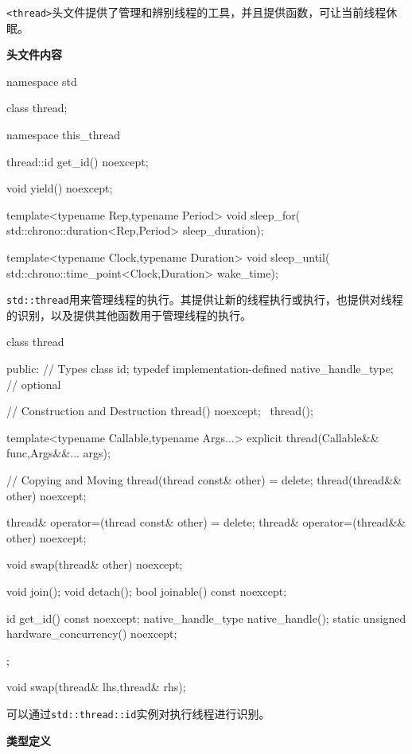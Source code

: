 
\texttt{<thread>}头文件提供了管理和辨别线程的工具，并且提供函数，可让当前线程休眠。

\textbf{头文件内容}

\begin{cpp}
namespace std
{
  class thread;

  namespace this_thread
  {
    thread::id get_id() noexcept;

    void yield() noexcept;

    template<typename Rep,typename Period>
    void sleep_for(
        std::chrono::duration<Rep,Period> sleep_duration);

    template<typename Clock,typename Duration>
    void sleep_until(
        std::chrono::time_point<Clock,Duration> wake_time);
  }
}
\end{cpp}


\texttt{std::thread}用来管理线程的执行。其提供让新的线程执行或执行，也提供对线程的识别，以及提供其他函数用于管理线程的执行。

\begin{cpp}
class thread
{
public:
  // Types
  class id;
  typedef implementation-defined native_handle_type; // optional

  // Construction and Destruction
  thread() noexcept;
  ~thread();

  template<typename Callable,typename Args...>
  explicit thread(Callable&& func,Args&&... args);

  // Copying and Moving
  thread(thread const& other) = delete;
  thread(thread&& other) noexcept;

  thread& operator=(thread const& other) = delete;
  thread& operator=(thread&& other) noexcept;

  void swap(thread& other) noexcept;

  void join();
  void detach();
  bool joinable() const noexcept;

  id get_id() const noexcept;
  native_handle_type native_handle();
  static unsigned hardware_concurrency() noexcept;
};

void swap(thread& lhs,thread& rhs);
\end{cpp}


可以通过\texttt{std::thread::id}实例对执行线程进行识别。

\textbf{类型定义}

